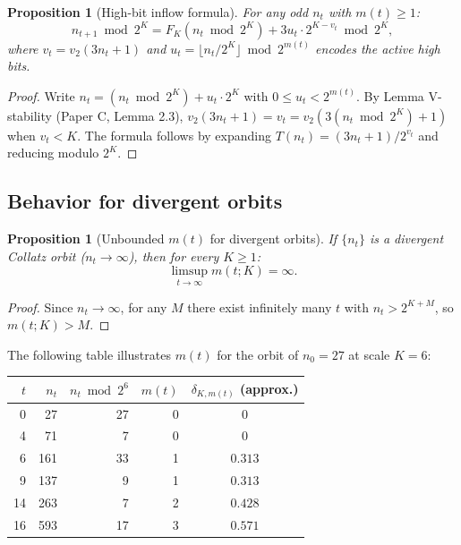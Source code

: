 \documentclass[12pt]{article}
\newtheorem{proposition}[theorem]{Proposition}
\theoremstyle{definition}
\newcommand{\vt}{v_2}
\begin{document}
\begin{proposition}[High-bit inflow formula]
\label{prop:highbit}
For any odd $n_t$ with $m(t) \geq 1$:
\[
  n_{t+1} \bmod 2^K = F_K(n_t \bmod 2^K) + 3u_t \cdot 2^{K - v_t} \bmod 2^K,
\]
where $v_t = \vt(3n_t + 1)$ and $u_t = \lfloor n_t / 2^K \rfloor \bmod 2^{m(t)}$ encodes the active high bits.
\end{proposition}

\begin{proof}
Write $n_t = (n_t \bmod 2^K) + u_t \cdot 2^K$ with $0 \leq u_t < 2^{m(t)}$. By Lemma V-stability (Paper C, Lemma 2.3), $\vt(3n_t+1) = v_t = \vt(3(n_t \bmod 2^K)+1)$ when $v_t < K$. The formula follows by expanding $T(n_t) = (3n_t+1)/2^{v_t}$ and reducing modulo $2^K$.
\end{proof}

\subsection{Behavior for divergent orbits}

\begin{proposition}[Unbounded $m(t)$ for divergent orbits]
\label{prop:divergent-mt}
If $\{n_t\}$ is a divergent Collatz orbit ($n_t \to \infty$), then for every $K \geq 1$:
\[
  \limsup_{t \to \infty} m(t; K) = \infty.
\]
\end{proposition}

\begin{proof}
Since $n_t \to \infty$, for any $M$ there exist infinitely many $t$ with $n_t > 2^{K+M}$, so $m(t;K) > M$.
\end{proof}

The following table illustrates $m(t)$ for the orbit of $n_0 = 27$ at scale $K = 6$:

\begin{center}
\begin{tabular}{@{}rrrrc@{}}
\toprule
$t$ & $n_t$ & $n_t \bmod 2^6$ & $m(t)$ & $\delta_{K,m(t)}$ (approx.) \\
\midrule
 0 &   27 &  27 & 0 & $0$ \\
 4 &   71 &   7 & 0 & $0$ \\
 6 &  161 &  33 & 1 & $0.313$ \\
 9 &  137 &   9 & 1 & $0.313$ \\
14 &  263 &   7 & 2 & $0.428$ \\
16 &  593 &  17 & 3 & $0.571$ \\
\bottomrule
\end{tabular}
\end{center}
\end{document}
